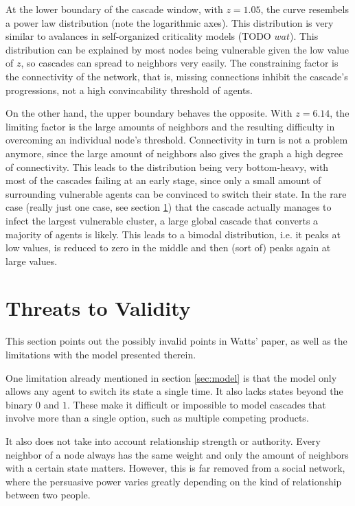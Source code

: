 \documentclass{sig-alternate-05-2015}
\begin{document}
At the lower boundary of the cascade window, with $z = 1.05$, the curve resembels a power law distribution (note the logarithmic axes). This distribution is very similar to avalances in self-organized criticality models (TODO $wat$). This distribution can be explained by most nodes being vulnerable given the low value of $z$, so cascades can spread to neighbors very easily. The constraining factor is the connectivity of the network, that is, missing connections inhibit the cascade's progressions, not a high convincability threshold of agents.

On the other hand, the upper boundary behaves the opposite. With $z = 6.14$, the limiting factor is the large amounts of neighbors and the resulting difficulty in overcoming an individual node's threshold. Connectivity in turn is not a problem anymore, since the large amount of neighbors also gives the graph a high degree of connectivity. This leads to the distribution being very bottom-heavy, with most of the cascades failing at an early stage, since only a small amount of surrounding vulnerable agents can be convinced to switch their state. In the rare case (really just one case, see section \ref{sec:threats}) that the cascade actually manages to infect the largest vulnerable cluster, a large global cascade that converts a majority of agents is likely. This leads to a bimodal distribution, i.e. it peaks at low values, is reduced to zero in the middle and then (sort of) peaks again at large values.


\section{Threats to Validity}\label{sec:threats}

This section points out the possibly invalid points in Watts' paper\cite{simplemodel}, as well as the limitations with the model presented therein.

One limitation already mentioned in section \ref{sec:model} is that the model only allows any agent to switch its state a single time. It also lacks states beyond the binary $0$ and $1$. These make it difficult or impossible to model cascades that involve more than a single option, such as multiple competing products.

It also does not take into account relationship strength or authority. Every neighbor of a node always has the same weight and only the amount of neighbors with a certain state matters. However, this is far removed from a social network, where the persuasive power varies greatly depending on the kind of relationship between two people.
\end{document}
